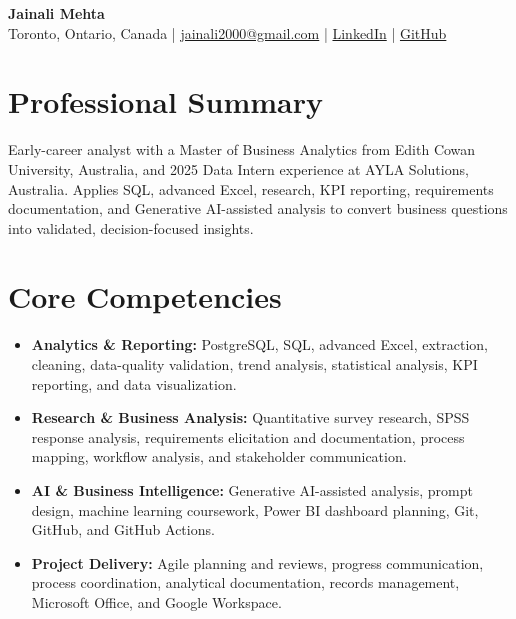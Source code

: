 \documentclass[letterpaper,10pt]{article}
\begin{document}
\begin{center}
  {\fontsize{17}{19}\selectfont\textbf{Jainali Mehta}}\\[2pt]
  \small Toronto, Ontario, Canada \;|\;
  \href{mailto:jainali2000@gmail.com}{jainali2000@gmail.com} \;|\;
  \href{https://www.linkedin.com/in/jainali-mehta}{LinkedIn} \;|\;
  \href{https://github.com/jainalimehta}{GitHub}
\end{center}
\vspace{-7pt}

\section{Professional Summary}
\small Early-career analyst with a Master of Business Analytics from Edith Cowan University, Australia, and 2025 Data Intern experience at AYLA Solutions, Australia. Applies SQL, advanced Excel, research, KPI reporting, requirements documentation, and Generative AI-assisted analysis to convert business questions into validated, decision-focused insights.

\section{Core Competencies}
\begin{itemize}[leftmargin=0.16in,label=\textbullet,topsep=0pt,itemsep=1pt,parsep=0pt]
  \item \small \textbf{Analytics \& Reporting:} PostgreSQL, SQL, advanced Excel, extraction, cleaning, data-quality validation, trend analysis, statistical analysis, KPI reporting, and data visualization.
  \item \small \textbf{Research \& Business Analysis:} Quantitative survey research, SPSS response analysis, requirements elicitation and documentation, process mapping, workflow analysis, and stakeholder communication.
  \item \small \textbf{AI \& Business Intelligence:} Generative AI-assisted analysis, prompt design, machine learning coursework, Power BI dashboard planning, Git, GitHub, and GitHub Actions.
  \item \small \textbf{Project Delivery:} Agile planning and reviews, progress communication, process coordination, analytical documentation, records management, Microsoft Office, and Google Workspace.
\end{itemize}
\end{document}
